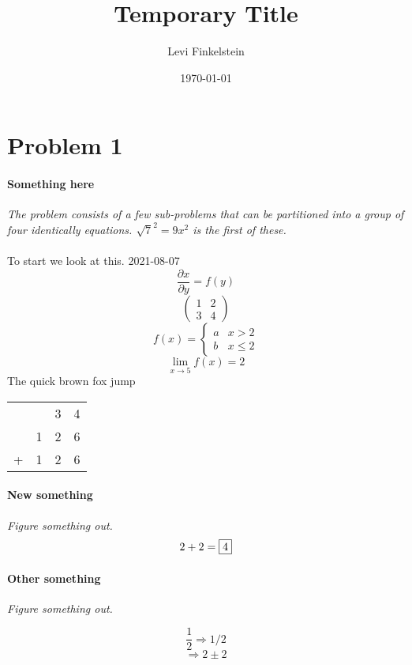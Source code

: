 \documentclass[12pt]{article}
\title{Temporary Title}
\author{Levi Finkelstein}
\date{\today}
\begin{document}
\maketitle

\section*{Problem 1}

\paragraph{Something here} 
\textit{The problem consists of a few sub-problems that can be partitioned into a group of four identically equations. $\sqrt{7}^2 = 9x^2$ is the first of these.}\\\\
To start we look at this.
2021-08-07
$$\frac{\partial x}{\partial y} = f(y)$$
$$\begin{pmatrix}
    1&2\\3&4
\end{pmatrix}$$
$$f(x)=\begin{cases}
    a&x>2\\b&x\leq2
\end{cases}$$
$$\lim_{x\to5}f(x)=2$$
The quick brown fox jump
\begin{center}
    \begin{tabular}{cccc}
            & & 3 & 4 \\
            & 1 & 2 & 6 \\
            \hline
        + & 1 & 2 & 6 \\
    \end{tabular}
\end{center}
\newpage

\paragraph{New something}
\textit{ Figure something out.}
$$2+2=\framebox{$4$}$$

\paragraph{Other something}
\textit{ Figure something out.}

$$\frac{1}{2} \Rightarrow 1/2$$
$$\Rightarrow 2\pm2$$
\end{document}
